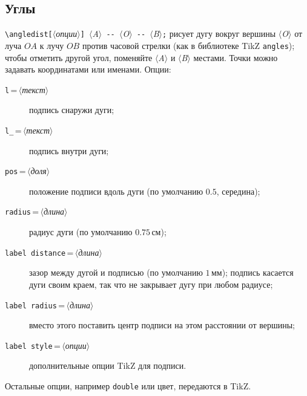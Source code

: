 \documentclass[a4paper,11pt]{article}
\newcommand\key[1]{\texttt{#1}}
\newcommand\meta[1]{\ensuremath{\langle}\textit{#1}\ensuremath{\rangle}}
\begin{document}
\subsection{Углы}
\verb|\angledist[|\meta{опции}\verb|] |\meta{A}\verb| -- |\meta{O}\verb| -- |\meta{B}\verb|;|
рисует дугу вокруг вершины \meta{O} от луча \(OA\) к лучу \(OB\) против
часовой стрелки (как в библиотеке TikZ \texttt{angles}); чтобы отметить
другой угол, поменяйте \meta{A} и \meta{B} местами. Точки можно задавать
координатами или именами. Опции:
\begin{description}
  \item[\key{l}\,=\,\meta{текст}] подпись снаружи дуги;
  \item[\key{l\_}\,=\,\meta{текст}] подпись внутри дуги;
  \item[\key{pos}\,=\,\meta{доля}] положение подписи вдоль дуги (по
    умолчанию \(0.5\), середина);
  \item[\key{radius}\,=\,\meta{длина}] радиус дуги (по умолчанию
    \(0.75\,\text{см}\));
  \item[\key{label distance}\,=\,\meta{длина}] зазор между дугой и подписью
    (по умолчанию \(1\,\text{мм}\)); подпись касается дуги своим краем, так
    что не закрывает дугу при любом радиусе;
  \item[\key{label radius}\,=\,\meta{длина}] вместо этого поставить центр
    подписи на этом расстоянии от вершины;
  \item[\key{label style}\,=\,\meta{опции}] дополнительные опции TikZ для
    подписи.
\end{description}
Остальные опции, например \key{double} или цвет, передаются в TikZ.
\begin{example}
\end{example}
\begin{example}
\end{example}
\end{document}
